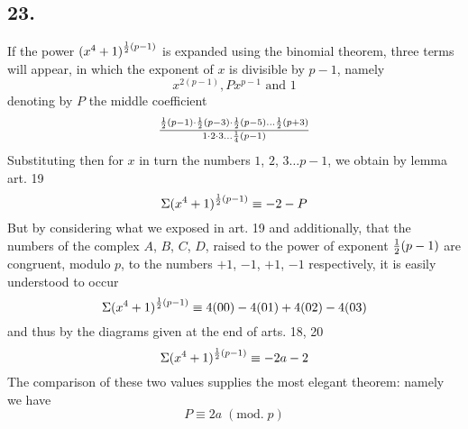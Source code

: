 \documentclass[twoside,12pt, showframe]{memoir}
\renewcommand{\pmod}[1]{\;(\textrm{mod.}\;#1)}
\let\oldfrac\frac
\def\frac#1#2{\mathchoice{\tfrac{#1}{#2}}{\oldfrac{#1}{#2}}{\genfrac{}{}{}{2}{#1}{#2\mathstrut}}{\genfrac{}{}{}{3}{#1}{#2\mathstrut}}}
\begin{document}
\subsection*{23.}
 
If the power \((x^{4}+1)^{\frac{1}{2}(p-1)}\) is expanded using the binomial theorem, three terms will appear, in which the exponent of \(x\) is divisible by \(p-1\), namely
\[x^{2(p-1)}, P x^{p-1} \text{ and } 1\]
denoting by \(P\) the middle coefficient
\[\frac{\frac{1}{2}(p-1) \cdot \frac{1}{2}(p-3) \cdot \frac{1}{2}(p-5) \ldots \frac{1}{2}(p+3)}{1 \cdot 2 \cdot 3 \ldots \frac{1}{4}(p-1)}\]
Substituting then for \(x\) in turn the numbers \(1\), \(2\), \(3 \ldots p-1\), we obtain by lemma art. 19
\[\Sigma(x^{4}+1)^{\frac{1}{2}(p-1)} \equiv-2-P\]
But by considering what we exposed in art. 19 and additionally, that the numbers of the complex \(A\), \(B\), \(C\), \(D\), raised to the power of exponent \(\frac{1}{2}(p-1)\) are congruent, modulo \(p\), to the numbers \(+1\), \(-1\), \(+1\), \(-1\) respectively, it is easily understood to occur
\[\Sigma(x^{4}+1)^{\frac{1}{2}(p-1)} \equiv 4(00)-4(01)+4(02)-4(03)\]
and thus by the diagrams given at the end of arts. 18, 20
\[\Sigma(x^{4}+1)^{\frac{1}{2}(p-1)} \equiv-2 a-2\]
The comparison of these two values supplies the most elegant theorem: namely we have
\[P \equiv 2 a\pmod{p}\]
%
\end{document}
